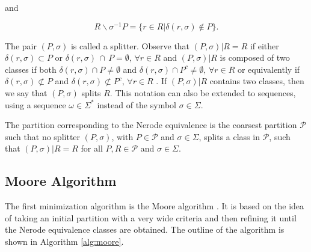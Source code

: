 {\noindent and

\begin{equation}\label{eq:splitquot}
R\backslash\sigma^{-1}P = \{r \in R | \delta(r,\sigma) \notin P\}.
\end{equation}

\noindent The pair $(P, \sigma)$ is called a splitter. Observe that $(P, \sigma)|R = R$ if either $\delta(r,\sigma) \subset P$
or $\delta(r,\sigma)\,\cap\,P = \emptyset,\,\forall r \in R$ and $(P,\sigma)|R$ is composed of two classes if both $\delta(r,\sigma)\cap P  \neq \emptyset$ and
$\delta(r,\sigma)\cap P^c  \neq \emptyset, \,\forall r \in R$  or equivalently if $\delta(r,\sigma) \not\subset P $   and  $\delta(r,\sigma)\not\subset P^c, \, \forall r \in R $ . If $(P, \sigma)|R$ contains two classes, then we say that $(P, \sigma)$ splits $R$. This notation can also be extended to sequences, using a sequence $\omega \in \Sigma^*$ instead of the symbol $\sigma \in \Sigma$.

\begin{proposition}\label{prop:nerequiv}
The partition corresponding to the Nerode equivalence is the coarsest partition $\mathcal{P}$ such that no splitter $(P,\sigma)$, with $P \in \mathcal{P}$ and $\sigma \in \Sigma$, splits a class in $\mathcal{P}$, such that $(P,\sigma)|R = R$ for all $P, R \in \mathcal{P}$ and $\sigma \in \Sigma$.
\end{proposition}

 
%
%
%
\subsection{Moore Algorithm}

The first minimization algorithm is the Moore algorithm \cite{moore1956gedanken}. It is based on the idea of taking an initial partition with a very wide criteria and then refining it until the Nerode equivalence classes are obtained. The outline of the algorithm is shown in Algorithm \ref{alg:moore}.

}

